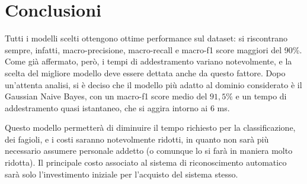 \section{Conclusioni}
Tutti i modelli scelti ottengono ottime performance sul dataset: si riscontrano
sempre, infatti, macro-precisione, macro-recall e macro-f1 score maggiori del 90\%.
Come già affermato, però, i tempi di addestramento variano notevolmente,
e la scelta del migliore modello deve essere dettata anche da questo fattore.
Dopo un'attenta analisi, si è deciso che il modello più adatto al dominio considerato
è il Gaussian Naive Bayes, con un macro-f1 score medio del $91,5\%$
e un tempo di addestramento quasi istantaneo, che si aggira intorno ai 6 ms. 

Questo modello permetterà di diminuire il tempo richiesto per la classificazione,
dei fagioli, e i costi saranno notevolmente ridotti, in quanto non sarà più 
necessario assumere personale addetto (o comunque lo si farà in maniera molto ridotta).
Il principale costo associato al sistema di riconoscimento automatico sarà
solo l'investimento iniziale per l'acquisto del sistema stesso.
